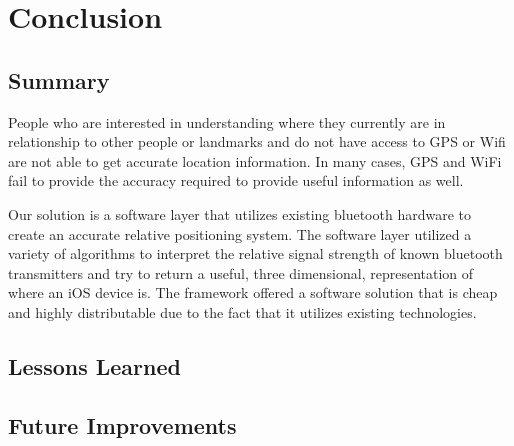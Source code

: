 \chapter{Conclusion}
\section{Summary}

People who are interested in understanding where they currently are in relationship to other people or landmarks and do
not have access to GPS or Wifi are not able to get accurate location information. In many cases, GPS and WiFi fail to provide the
accuracy required to provide useful information as well.
\newline \par
Our solution is a software layer that utilizes existing bluetooth
hardware to create an accurate relative positioning system. The software layer utilized a variety of algorithms to interpret the
relative signal strength of known bluetooth transmitters and try to return a useful, three dimensional, representation of
where an iOS device is. The framework offered a software solution that is cheap and
highly distributable due to the fact that it utilizes existing technologies.

\section{Lessons Learned}

\section{Future Improvements}
